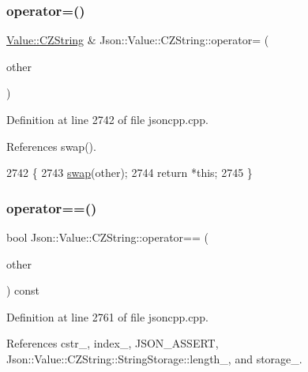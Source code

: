 \subsubsection{\texorpdfstring{operator=()}{operator=()}}
{\footnotesize\ttfamily \hyperlink{class_json_1_1_value_1_1_c_z_string}{Value\+::\+C\+Z\+String} \& Json\+::\+Value\+::\+C\+Z\+String\+::operator= (\begin{DoxyParamCaption}\item[{\hyperlink{class_json_1_1_value_1_1_c_z_string}{C\+Z\+String}}]{other }\end{DoxyParamCaption})}



Definition at line 2742 of file jsoncpp.\+cpp.



References swap().


\begin{DoxyCode}
2742                                                       \{
2743   \hyperlink{class_json_1_1_value_1_1_c_z_string_ad59f3542d2eea749a6a63409d1a02207}{swap}(other);
2744   \textcolor{keywordflow}{return} *\textcolor{keyword}{this};
2745 \}
\end{DoxyCode}
\mbox{\label{class_json_1_1_value_1_1_c_z_string_ad41766c98fc6a6d5fcd72aaf78fc5db0}} 
\subsubsection{\texorpdfstring{operator==()}{operator==()}}
{\footnotesize\ttfamily bool Json\+::\+Value\+::\+C\+Z\+String\+::operator== (\begin{DoxyParamCaption}\item[{\hyperlink{class_json_1_1_value_1_1_c_z_string}{C\+Z\+String} const \&}]{other }\end{DoxyParamCaption}) const}



Definition at line 2761 of file jsoncpp.\+cpp.



References cstr\+\_\+, index\+\_\+, J\+S\+O\+N\+\_\+\+A\+S\+S\+E\+RT, Json\+::\+Value\+::\+C\+Z\+String\+::\+String\+Storage\+::length\+\_\+, and storage\+\_\+.


